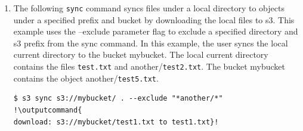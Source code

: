 \documentclass{beamer}
\newcommand{\outputcommand}[1]{\color{darkgreen}{#1}}
\begin{document}
\begin{frame}
\begin{itemize}
\begin{enumerate}
\lstset{language=shell}
\begin{lstlisting}[escapechar=!]
$ s3 sync . s3://mybucket --exclude "*.jpg"
!\outputcommand{
upload: test2.txt to s3://mybucket/test2.txt}!
\end{lstlisting}

\item The following \texttt{sync} command syncs files under a local directory to objects under a specified prefix and bucket by downloading the local files to \acrshort{s3}. This example uses the --exclude parameter flag to exclude a specified directory and \acrshort{s3} prefix from the sync command. In this example, the user syncs the local current directory to the bucket mybucket. The local current directory contains the files \texttt{test.txt} and another/\texttt{test2.txt}. The bucket mybucket contains the object another/\texttt{test5.txt}.

\lstset{language=shell}
\begin{lstlisting}[escapechar=!]
$ s3 sync s3://mybucket/ . --exclude "*another/*"
!\outputcommand{
download: s3://mybucket/test1.txt to test1.txt}!
\end{lstlisting}
\end{enumerate}
\end{itemize}

\end{frame}

\end{document}
